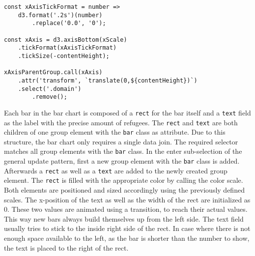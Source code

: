 \begin{minipage}{0.9\linewidth}
    \begin{lstlisting}[style=htmlCSSjs, captionpos=b, caption={The x axis implementation of the bar chart. The first constant defines the tick format. For each number there should be two significant digits. As the zero value is represented as "0.0" to match the previous rule of two significant digits, it is simply replaced by "0". The second constant defines the function creating the axis. The previous tick format is passed here. Furthermore the \texttt{tickSize} is set to the height of the diagram. This way the initially small tick lines now cover the whole height of the diagram and allow for easier and more accurate readouts. Finally the \texttt{xAxisParentGroup} element, which is part of ther permantent hierarchical structure of the bar chart, calls the \texttt{xAxis} function. This adds the Axis to the diagram. As a last step the domain lines are selected and removed for styling reasons. (Section from \ref{app:bar-chart} lines 60ff)}, label={lst:bar-chart-axes}]
const xAxisTickFormat = number =>
    d3.format('.2s')(number)
        .replace('0.0', '0');

const xAxis = d3.axisBottom(xScale)
    .tickFormat(xAxisTickFormat)
    .tickSize(-contentHeight);

xAxisParentGroup.call(xAxis)
    .attr('transform', `translate(0,${contentHeight})`)
    .select('.domain')
        .remove();
    \end{lstlisting}
\end{minipage}

Each bar in the bar chart is composed of a \texttt{rect} for the bar itself and a \texttt{text} field as the label with the precise amount of refugees. The \texttt{rect} and \texttt{text} are both children of one group element with the \texttt{bar} class as attribute. Due to this structure, the bar chart only requires a single data join. The required selector matches all group elements with the \texttt{bar} class. In the enter sub-selection of the general update pattern, first a new group element with the \texttt{bar} class is added. Afterwards a \texttt{rect} as well as a \texttt{text} are added to the newly created group element. The \texttt{rect} is filled with the appropriate color by calling the color scale. Both elements are positioned and sized accordingly using the previously defined scales. The x-position of the text as well as the width of the rect are initialized as 0. These two values are animated using a transition, to reach their actual values. This way new bars always build themselves up from the left side. The text field usually tries to stick to the inside right side of the rect. In case where there is not enough space available to the left, as the bar is shorter than the number to show, the text is placed to the right of the rect.

